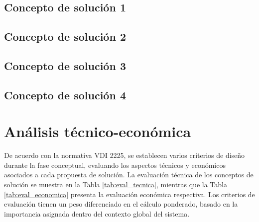\subsection{Concepto de solución 1}
\subsection{Concepto de solución 2}
\subsection{Concepto de solución 3}
\subsection{Concepto de solución 4}

\section{Análisis técnico-económica}

De acuerdo con la normativa VDI 2225, se establecen varios criterios de diseño durante la fase conceptual, evaluando los aspectos técnicos y económicos asociados a cada propuesta de solución. La evaluación técnica de los conceptos de solución se muestra en la Tabla \ref{tab:eval_tecnica}, mientras que la Tabla \ref{tab:eval_economica} presenta la evaluación económica respectiva. Los criterios de evaluación tienen un peso diferenciado en el cálculo ponderado, basado en la importancia asignada dentro del contexto global del sistema.

